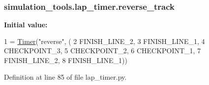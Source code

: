 \subsubsection[{\texorpdfstring{reverse\+\_\+track}{reverse_track}}]{\setlength{\rightskip}{0pt plus 5cm}simulation\+\_\+tools.\+lap\+\_\+timer.\+reverse\+\_\+track}\hypertarget{namespacesimulation__tools_1_1lap__timer_a05166a035886cf7f2693a8f72dc05bbc}{}\label{namespacesimulation__tools_1_1lap__timer_a05166a035886cf7f2693a8f72dc05bbc}
{\bfseries Initial value\+:}
\begin{DoxyCode}
1 = \hyperlink{classsimulation__tools_1_1lap__timer_1_1_timer}{Timer}(\textcolor{stringliteral}{"reverse"}, (
2     FINISH\_LINE\_2,
3     FINISH\_LINE\_1,
4     CHECKPOINT\_3,
5     CHECKPOINT\_2,
6     CHECKPOINT\_1,
7     FINISH\_LINE\_2,
8     FINISH\_LINE\_1))
\end{DoxyCode}


Definition at line 85 of file lap\+\_\+timer.\+py.

